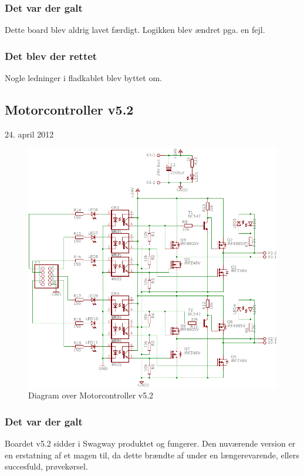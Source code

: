 \documentclass[a4paper,oneside,article,danish,table]{memoir}
\newcommand{\boarddate}[1]{\textcolor{blue!80!black}{#1}}
\begin{document}
\subsubsection{Det var der galt} 
Dette board blev aldrig lavet færdigt.
Logikken blev ændret pga. en fejl.
\subsubsection{Det blev der rettet}
Nogle ledninger i fladkablet blev byttet om.
\subsection{Motorcontroller v5.2}
\boarddate{24. april 2012}

\begin{figure}[htbp]
  \centering
  \includegraphics[width=\textwidth]{pictures/MotorcontrollerSch5-2.pdf}
  \caption{Diagram over Motorcontroller v5.2}
  \label{fig:mosch5.2}
\end{figure}
\subsubsection{Det var der galt} 
Boardet v5.2 sidder i Swagway produktet og fungerer. Den nuværende version er en erstatning af et magen til, da dette brændte af under en længerevarende, ellers succesfuld, prøvekørsel.
\end{document}

